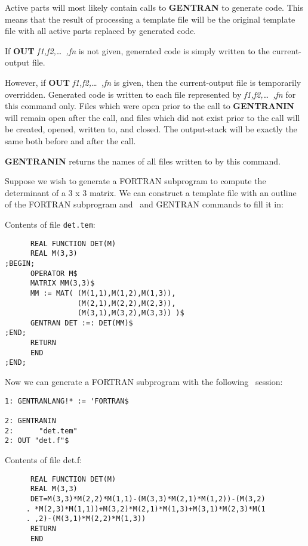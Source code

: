 Active parts will most likely contain calls to {\bf GENTRAN} to
generate code.  This means that the result of processing a
template file will be the original template file with all active
parts replaced by generated code.

If {\bf OUT} {\it f1,f2,\dots\ ,fn} is not given, generated code is simply
written to the current-output file.

However, if {\bf OUT} {\it  f1,f2,\dots\ ,fn}
is given, then the current-output file
is temporarily overridden.  Generated code is written to each file
represented by {\it f1,f2,\dots\ ,fn} for this command only.  Files
which were open prior to the call to {\bf GENTRANIN} will remain open
after the call, and files which did not exist prior to the call will
be created, opened, written to, and closed.  The output-stack will be
exactly the same both before and after the call.


{\bf GENTRANIN} returns the names of all files written to by this
command.
\newpage
\begin{describe}{\example}
Suppose we wish to generate a FORTRAN subprogram to compute the
determinant of a 3 x 3 matrix.  We can construct a template
file with an outline of the FORTRAN subprogram and \REDUCE\ and
GENTRAN commands to fill it in:

Contents of file {\tt det.tem}:
\end{describe}
\begin{verbatim}
      REAL FUNCTION DET(M)
      REAL M(3,3)
;BEGIN;
      OPERATOR M$
      MATRIX MM(3,3)$
      MM := MAT( (M(1,1),M(1,2),M(1,3)),
                 (M(2,1),M(2,2),M(2,3)),
                 (M(3,1),M(3,2),M(3,3)) )$
      GENTRAN DET :=: DET(MM)$
;END;
      RETURN
      END
;END;
\end{verbatim}

\begin{describe}{}
Now we can generate a FORTRAN subprogram with the following
\REDUCE\ session:
\begin{verbatim}
1: GENTRANLANG!* := 'FORTRAN$

2: GENTRANIN
2:      "det.tem"
2: OUT "det.f"$
\end{verbatim}
Contents of file det.f:
\end{describe}
\begin{verbatim}
      REAL FUNCTION DET(M)
      REAL M(3,3)
      DET=M(3,3)*M(2,2)*M(1,1)-(M(3,3)*M(2,1)*M(1,2))-(M(3,2)
     . *M(2,3)*M(1,1))+M(3,2)*M(2,1)*M(1,3)+M(3,1)*M(2,3)*M(1
     . ,2)-(M(3,1)*M(2,2)*M(1,3))
      RETURN
      END
\end{verbatim}


